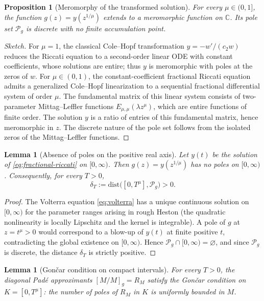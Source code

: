 \documentclass[11pt]{article}
\newtheorem{lemma}[theorem]{Lemma}
\newtheorem{proposition}[theorem]{Proposition}
\theoremstyle{definition}
\theoremstyle{remark}
\begin{document}
\begin{proposition}[Meromorphy of the transformed solution]
\label{prop:meromorphy}
For every $\mu\in(0,1]$, the function $g(z)=y(z^{1/\mu})$ extends to a meromorphic function on $\mathbb{C}$. Its pole set $\mathcal{P}_{g}$ is discrete with no finite accumulation point.
\end{proposition}

\begin{proof}[Sketch]
For $\mu=1$, the classical Cole--Hopf transformation $y=-w'/(c_{2}w)$ reduces the Riccati equation to a second-order linear ODE with constant coefficients, whose solutions are entire; thus $y$ is meromorphic with poles at the zeros of $w$. For $\mu\in(0,1)$, the constant-coefficient fractional Riccati equation admits a generalized Cole--Hopf linearization to a sequential fractional differential system of order $\mu$. The fundamental matrix of this linear system consists of two-parameter Mittag--Leffler functions $E_{\mu,\mu}(\lambda z^{\mu})$, which are entire functions of finite order. The solution $y$ is a ratio of entries of this fundamental matrix, hence meromorphic in $z$. The discrete nature of the pole set follows from the isolated zeros of the Mittag--Leffler functions.
\end{proof}

\begin{lemma}[Absence of poles on the positive real axis]
\label{lem:no-real-poles}
Let $y(t)$ be the solution of \eqref{eq:fractional-riccati} on $[0,\infty)$. Then $g(z)=y(z^{1/\mu})$ has no poles on $[0,\infty)$. Consequently, for every $T>0$,
\begin{equation}
\delta_{T}:=\mathrm{dist}\bigl([0,T^{\mu}],\mathcal{P}_{g}\bigr)>0.
\label{eq:delta-T}
\end{equation}
\end{lemma}

\begin{proof}
The Volterra equation \eqref{eq:volterra} has a unique continuous solution on $[0,\infty)$ for the parameter ranges arising in rough Heston (the quadratic nonlinearity is locally Lipschitz and the kernel is integrable). A pole of $g$ at $z=t^{\mu}>0$ would correspond to a blow-up of $y(t)$ at finite positive $t$, contradicting the global existence on $[0,\infty)$. Hence $\mathcal{P}_{g}\cap[0,\infty)=\varnothing$, and since $\mathcal{P}_{g}$ is discrete, the distance $\delta_{T}$ is strictly positive.
\end{proof}

\begin{lemma}[Gon\v{c}ar condition on compact intervals]
\label{lem:goncar-interval}
For every $T>0$, the diagonal Pad\'e approximants $[M/M]_{g}=R_{M}$ satisfy the Gon\v{c}ar condition on $K=[0,T^{\mu}]$: the number of poles of $R_{M}$ in $K$ is uniformly bounded in $M$.
\end{lemma}
\end{document}
